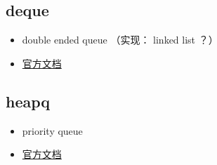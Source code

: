 
\begin{issues}
\issueDraft
\end{issues}

\subsection{deque}
\begin{itemize}
\item double ended queue （实现： linked list ？）
\item \href{https://docs.python.org/3/library/collections.html}{官方文档}
\end{itemize}

\subsection{heapq}
\begin{itemize}
\item priority queue
\item \href{https://docs.python.org/3/library/heapq.html}{官方文档}
\end{itemize}

